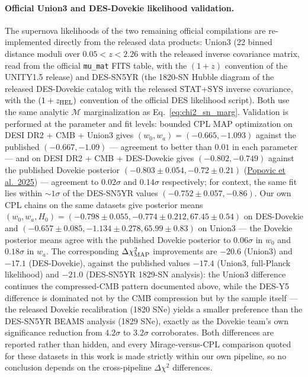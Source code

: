 \documentclass[11pt,letterpaper]{article}
\begin{document}
\paragraph{Official Union3 and DES-Dovekie likelihood validation.} The supernova likelihoods of the two remaining official compilations are re-implemented directly from the released data products: Union3 (22 binned distance moduli over $0.05 < z < 2.26$ with the released inverse covariance matrix, read from the official \texttt{mu\_mat} FITS table, with the $(1+z)$ convention of the UNITY1.5 release) and DES-SN5YR (the 1820-SN Hubble diagram of the released DES-Dovekie catalog with the released STAT+SYS inverse covariance, with the $(1+z_{\rm HEL})$ convention of the official DES likelihood script). Both use the same analytic $\mathcal{M}$ marginalization as Eq.~\ref{eq:chi2_sn_marg}. Validation is performed at the parameter and fit levels: bounded CPL MAP optimization on DESI DR2 + CMB + Union3 gives $(w_0, w_a) = (-0.665, -1.093)$ against the published $(-0.667, -1.09)$ --- agreement to better than $0.01$ in each parameter --- and on DESI DR2 + CMB + DES-Dovekie gives $(-0.802, -0.749)$ against the published Dovekie posterior $(-0.803 \pm 0.054, -0.72 \pm 0.21)$ (\href{https://arxiv.org/abs/2511.07517}{Popovic et al.\ 2025}) --- agreement to $0.02\sigma$ and $0.14\sigma$ respectively; for context, the same fit lies within $\sim 1\sigma$ of the DES-SN5YR values $(-0.752 \pm 0.057, -0.86)$. Our own CPL chains on the same datasets give posterior means $(w_0, w_a, H_0) = (-0.798 \pm 0.055, -0.774 \pm 0.212, 67.45 \pm 0.54)$ on DES-Dovekie and $(-0.657 \pm 0.085, -1.134 \pm 0.278, 65.99 \pm 0.83)$ on Union3 --- the Dovekie posterior means agree with the published Dovekie posterior to $0.06\sigma$ in $w_0$ and $0.18\sigma$ in $w_a$. The corresponding $\Delta\chi^2_{\rm MAP}$ improvements are $-20.6$ (Union3) and $-17.1$ (DES-Dovekie), against the published values $-17.4$ (Union3, full-Planck likelihood) and $-21.0$ (DES-SN5YR 1829-SN analysis): the Union3 difference continues the compressed-CMB pattern documented above, while the DES-Y5 difference is dominated not by the CMB compression but by the sample itself --- the released Dovekie recalibration (1820 SNe) yields a smaller preference than the DES-SN5YR BEAMS analysis (1829 SNe), exactly as the Dovekie team's own significance reduction from $4.2\sigma$ to $3.2\sigma$ corroborates. Both differences are reported rather than hidden, and every Mirage-versus-CPL comparison quoted for these datasets in this work is made strictly within our own pipeline, so no conclusion depends on the cross-pipeline $\Delta\chi^2$ differences.
\end{document}
